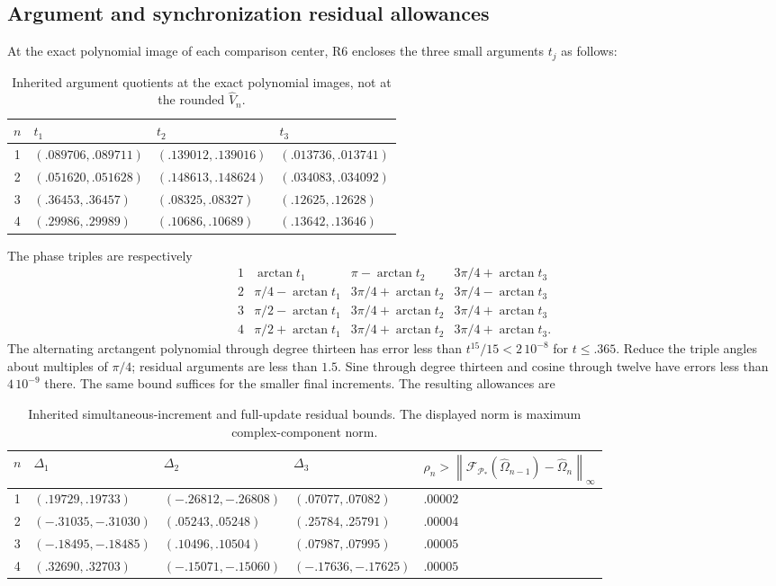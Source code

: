 \documentclass[11pt,a4paper]{article}
\numberwithin{equation}{section}
\newcommand{\norm}[1]{\left\lVert#1\right\rVert}
\newcommand{\Fmap}{\mathcal F}
\newcommand{\Params}{\mathcal P}
\begin{document}
\subsection{Argument and synchronization residual allowances}
At the exact polynomial image of each comparison center, R6 encloses the
three small arguments $t_j$ as follows:
\begin{table}[htbp]
\centering\small
\begin{tabular}{@{}clll@{}}
\toprule
$n$&$t_1$&$t_2$&$t_3$\\ \midrule
1&$(.089706,.089711)$&$(.139012,.139016)$&$(.013736,.013741)$\\
2&$(.051620,.051628)$&$(.148613,.148624)$&$(.034083,.034092)$\\
3&$(.36453,.36457)$&$(.08325,.08327)$&$(.12625,.12628)$\\
4&$(.29986,.29989)$&$(.10686,.10689)$&$(.13642,.13646)$\\
\bottomrule
\end{tabular}
\caption{Inherited argument quotients at the exact polynomial images, not
at the rounded $\widehat V_n$.}
\label{tab:atan}
\end{table}
The phase triples are respectively
\[
\begin{array}{c|lll}
1&\arctan t_1&\pi-\arctan t_2&3\pi/4+\arctan t_3\\
2&\pi/4-\arctan t_1&3\pi/4+\arctan t_2&3\pi/4-\arctan t_3\\
3&\pi/2-\arctan t_1&3\pi/4+\arctan t_2&3\pi/4+\arctan t_3\\
4&\pi/2+\arctan t_1&3\pi/4+\arctan t_2&3\pi/4+\arctan t_3.
\end{array}
\]
The alternating arctangent polynomial through degree thirteen has error
less than $t^{15}/15<2\,10^{-8}$ for $t\leq.365$.
Reduce the triple angles about multiples of $\pi/4$; residual arguments
are less than $1.5$. Sine through degree thirteen and cosine through
twelve have errors less than $4\,10^{-9}$ there. The same bound suffices
for the smaller final increments. The resulting allowances are
\begin{table}[htbp]
\centering\small
\begin{tabular}{@{}cllll@{}}
\toprule
$n$&$\Delta_1$&$\Delta_2$&$\Delta_3$&
$\rho_n>\norm{\Fmap_{\Params_*}(\widehat\Omega_{n-1})-\widehat\Omega_n}_\infty$\\
\midrule
1&$(.19729,.19733)$&$(-.26812,-.26808)$&$(.07077,.07082)$&$.00002$\\
2&$(-.31035,-.31030)$&$(.05243,.05248)$&$(.25784,.25791)$&$.00004$\\
3&$(-.18495,-.18485)$&$(.10496,.10504)$&$(.07987,.07995)$&$.00005$\\
4&$(.32690,.32703)$&$(-.15071,-.15060)$&$(-.17636,-.17625)$&$.00005$\\
\bottomrule
\end{tabular}
\caption{Inherited simultaneous-increment and full-update residual bounds.
The displayed norm is maximum complex-component norm.}
\label{tab:residualbounds}
\end{table}
\end{document}
